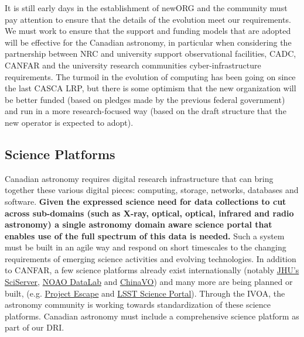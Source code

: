 \documentclass[11pt]{article}
\begin{document}
It is still early days in the establishment of newORG and the community must pay attention to ensure that the details of the evolution meet our requirements. 
We must work to ensure that the support and funding models that are adopted will be effective for the Canadian astronomy, in particular when considering the partnership between NRC and university support observational facilities, CADC, CANFAR and the university research communities cyber-infrastructure requirements.
The turmoil in the evolution of computing has been going on since the last CASCA LRP, but there is some optimism that the new organization will be better funded (based on pledges made by the previous federal government) and run in a more research-focused way (based on the draft structure that the new operator is expected to adopt). 



\subsection{Science Platforms}
Canadian astronomy requires digital research infrastructure that can bring together these various digital pieces:  computing, storage,  networks, databases and software.  {\bf Given the expressed science need for data collections to cut across sub-domains (such as X-ray, optical, optical, infrared and radio astronomy) a single astronomy domain aware science portal that enables use of the full spectrum of this data is needed.} 
Such a system must be built in an agile way and respond on short timescales to the changing requirements of emerging science activities and evolving technologies.  In addition to CANFAR, a few science platforms already exist internationally (notably  \href{http://sciserver.org}{JHU's SciServer}, \href{https://datalab.noao.edu/}{NOAO DataLab} and \href{http://astrocloud.china-vo.org}{ChinaVO}) and many more are being planned or built, (e.g. \href{https://projectescape.eu/services/escape-science-platform}{Project Escape} and \href{https://docushare.lsst.org/docushare/dsweb/Get/LSE-319}{LSST Science Portal}).  Through the IVOA, the astronomy community is working towards standardization of these science platforms.  Canadian astronomy must include a comprehensive science platform as part of our DRI.
\end{document}
